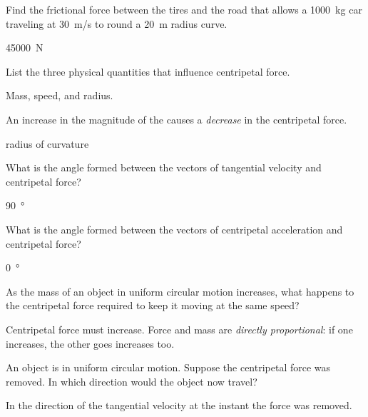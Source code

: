 \documentclass[../main-physics-workbook.tex]{subfiles}
\begin{document}
\begin{questions}
\question \label{MJm5VE} %
Find the frictional force between the tires and the road that allows a \SI{1000}{kg} car traveling at \SI{30}{m/s} to round a \SI{20}{m} radius curve.

\begin{solution}
\SI{45000}{N}
\end{solution}

\question \label{GD8Yff} %
List the three physical quantities that influence centripetal force.

\begin{solution}
Mass, speed, and radius.
\end{solution}

\question \label{aEtlVz} %
An increase in the magnitude of the  causes a \textit{decrease} in the centripetal force.

\begin{solution}
radius of curvature
\end{solution}

\question \label{wS6Htw} %
What is the angle formed between the vectors of tangential velocity and centripetal force?

\begin{solution}
\SI{90}{\degree}
\end{solution}


\question \label{barV9C} %
What is the angle formed between the vectors of centripetal acceleration and centripetal force?

\begin{solution}
\SI{0}{\degree}
\end{solution}


\question \label{M6NkHB} %
As the mass of an object in uniform circular motion increases, what happens to the centripetal force required to keep it moving at the same speed?

\begin{solution}
Centripetal force must increase. Force and mass are \textit{directly proportional}: if one increases, the other goes increases too.
\end{solution}

\question \label{G8I4Up} %
An object is in uniform circular motion. Suppose the centripetal force was removed. In which direction would the object now travel?

\begin{solution}
In the direction of the tangential velocity at the instant the force was removed.
\end{solution}



\end{questions}
\end{document}
